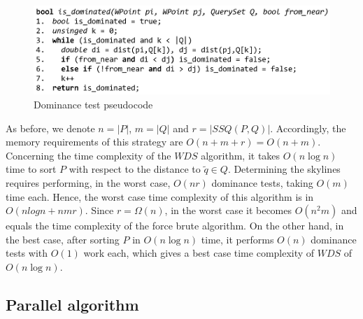 \documentclass[11pt,onecolumn]{elsart3p}
\begin{document}
         \begin{figure}[h]
            \begin{center}
            \includegraphics[width=0.75\linewidth]{img/algorithm_DT.eps}
            \caption{Dominance test pseudocode}\label{fig:alg_DomTest}
            \end{center}
         \end{figure}


         \vspace{1.5em}

          As before, we denote $n=|P|$, $m=|Q|$ and $r=|SSQ(P,Q)|$. Accordingly, the memory requirements of this strategy are $O(n+m+r) = O(n+m)$. Concerning the time complexity of the $WDS$ algorithm, it takes $O(n\log n)$ time to sort $P$ with respect to the distance to $\tilde{q}\in Q$. Determining the skylines requires performing, in the worst case, $O(nr)$ dominance tests, taking $O(m)$ time each. Hence, the worst case time complexity of this algorithm is in $O(nlogn + nmr)$. Since $r = \Omega(n)$, in the worst case it becomes $O(n^2m)$ and equals the time complexity of the force brute algorithm. On the other hand, in the best case, after sorting $P$ in $O(n\log n)$ time, it performs $O(n)$ dominance tests with $O(1)$ work each, which gives a best case time complexity of $WDS$ of $O(n\log n)$.


    \subsection{Parallel algorithm} \label{seq:paral_alg}
\end{document}
